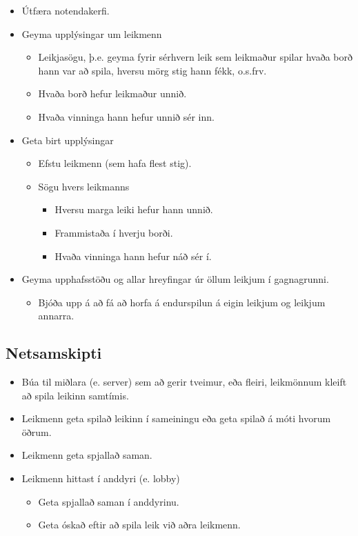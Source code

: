 \documentclass[11pt,a4paper,oneside]{article}
\begin{document}
	\begin{itemize}
		\item Útfæra notendakerfi.
		\item Geyma upplýsingar um leikmenn
			\begin{itemize}
				\item Leikjasögu, þ.e. geyma fyrir sérhvern leik sem leikmaður spilar hvaða borð hann var að spila, hversu mörg stig hann fékk, o.s.frv.
				\item Hvaða borð hefur leikmaður unnið.
				\item Hvaða vinninga hann hefur unnið sér inn.
			\end{itemize}
		\item Geta birt upplýsingar
			\begin{itemize}
				\item Efstu leikmenn (sem hafa flest stig).
				\item Sögu hvers leikmanns
					\begin{itemize}
						\item Hversu marga leiki hefur hann unnið.
						\item Frammistaða í hverju borði.
						\item Hvaða vinninga hann hefur náð sér í.
					\end{itemize}
			\end{itemize}
		\item Geyma upphafsstöðu og allar hreyfingar úr öllum leikjum í gagnagrunni.
			\begin{itemize}
				\item Bjóða upp á að fá að horfa á endurspilun á eigin leikjum og leikjum annarra.
			\end{itemize}
	\end{itemize}

	\subsection*{Netsamskipti}
		\begin{itemize}
			\item Búa til miðlara (e. server) sem að gerir tveimur, eða fleiri, leikmönnum kleift að spila leikinn samtímis.
			\item Leikmenn geta spilað leikinn í sameiningu eða geta spilað á móti hvorum öðrum.
			\item Leikmenn geta spjallað saman.
			\item Leikmenn hittast í anddyri (e. lobby)
				\begin{itemize}
					\item Geta spjallað saman í anddyrinu.
					\item Geta óskað eftir að spila leik við aðra leikmenn.
				\end{itemize}
		\end{itemize}
\end{document}
